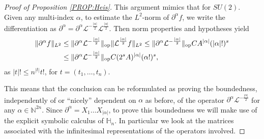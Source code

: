 \documentclass[12pt,oneside,a4paper]{book}
\numberwithin{equation}{section}     %
\theoremstyle{plain}
\theoremstyle{definition}
\DeclareMathOperator{\OP}{op}
\newcommand{\N}{{\mathbb N}}
\newcommand{\slp}{{\mathcal L}}
\begin{document}
\begin{proof}[Proof of Proposition \ref{PROP:Heis}]
	This argument mimics that for $SU(2)$. Given any multi-index $\alpha$, to estimate the $L^2$-norm of $\partial^\alpha f$, we write the differentiation as $\partial^\alpha=\partial^\alpha\slp^{-\frac{|\alpha|}{2}}\slp^{\frac{|\alpha|}{2}}$. Then norm properties and hypotheses yield
	\begin{align}\notag
	\|\partial^\alpha f\|_{L^2}&\leq\|\partial^\alpha\slp^{-\frac{|\alpha|}{2}}\|_{\OP}\|\slp^{\frac{|\alpha|}{2}}f\|_{L^2}\leq\|\partial^\alpha\slp^{-\frac{|\alpha|}{2}}\|_{\OP}CA^{|\alpha|}(|\alpha|!)^s\\
	&\leq\|\partial^\alpha\slp^{-\frac{|\alpha|}{2}}\|_{\OP}C(2^sA)^{|\alpha|}(\alpha!)^s,\label{alpha}
	\end{align}
	as $|t|!\leq n^{|t|}t!$, for $t=(t_1,\dots, t_n)$.
	
	This means that the conclusion can be reformulated as proving the boundedness, independently of or ``nicely'' dependent on $\alpha$ as before, of the operator $\partial^\alpha\slp^{-\frac{|\alpha|}{2}}$ for any $\alpha\in\N^{2n}$. Since $\partial^\alpha=X_1\dots X_{|\alpha|}$, to prove this boundedness we will make use of the explicit symbolic calculus of $\mathbb{H}_n$. In particular we look at the matrices associated with the infinitesimal representations of the operators involved. 
	

\end{proof}
\end{document}

